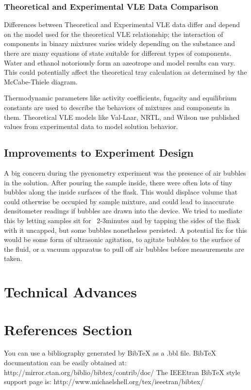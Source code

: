 \documentclass[lettersize,journal]{IEEEtran}
\begin{document}
\subsubsection{Theoretical and Experimental VLE Data Comparison}
Differences between Theoretical and Experimental VLE data differ and depend on the model used for the theoretical VLE relationship; the interaction of components in binary mixtures varies widely depending on the substance and there are many equations of state suitable for different types of components. Water and ethanol notoriously form an azeotrope and model results can vary. This could potentially affect the theoretical tray calculation as determined by the McCabe-Thiele diagram. 

Thermodynamic parameters like activity coefficients, fugacity and equilibrium constants are used to describe the behaviors of mixtures and components in them. Theoretical VLE models like Val-Laar, NRTL, and Wilson use published values from experimental data to model solution behavior.
\subsection{Improvements to Experiment Design}
A big concern during the pycnometry experiment was the presence of air bubbles in the solution. After pouring the sample inside, there were often lots of tiny bubbles along the inside surfaces of the flask. This would displace volume that could otherwise be occupied by sample mixture, and could lead to inaccurate densitometer readings if bubbles are drawn into the device. We tried to mediate this by letting samples sit for ~2-3minutes and by tapping the sides of the flask with it uncapped, but some bubbles nonetheless persisted. A potential fix for this would be some form of ultrasonic agitation, to agitate bubbles to the surface of the fluid, or a vacuum apparatus to pull off air bubbles before measurements are taken.
 


\section{Technical Advances}





\section{References Section}
You can use a bibliography generated by BibTeX as a .bbl file.
BibTeX documentation can be easily obtained at:
http://mirror.ctan.org/biblio/bibtex/contrib/doc/
The IEEEtran BibTeX style support page is:
http://www.michaelshell.org/tex/ieeetran/bibtex/
\end{document}
